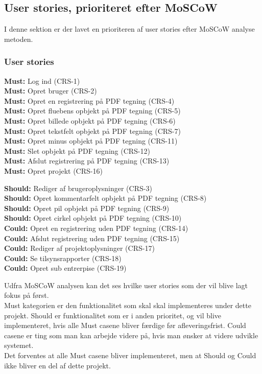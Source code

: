 \subsection{User stories, prioriteret efter MoSCoW} \label{sec:MoSCoW}
I denne sektion er der lavet en prioriteren af user stories efter MoSCoW analyse metoden.

\subsubsection{User stories}
\textbf{Must:} Log ind (CRS-1) \\
\textbf{Must:} Opret bruger (CRS-2) \\
\textbf{Must:} Opret en registrering på PDF tegning (CRS-4) \\
\textbf{Must:} Opret fluebens opbjekt på PDF tegning (CRS-5) \\
\textbf{Must:} Opret billede opbjekt på PDF tegning (CRS-6) \\
\textbf{Must:} Opret tekstfelt opbjekt på PDF tegning (CRS-7) \\
\textbf{Must:} Opret minus opbjekt på PDF tegning (CRS-11) \\
\textbf{Must:} Slet opbjekt på PDF tegning (CRS-12) \\
\textbf{Must:} Afslut registrering på PDF tegning (CRS-13) \\
\textbf{Must:} Opret projekt (CRS-16) \\

\clearpage

\textbf{Should:} Rediger af brugeroplysninger (CRS-3) \\
\textbf{Should:} Opret kommentarfelt opbjekt på PDF tegning (CRS-8) \\
\textbf{Should:} Opret pil opbjekt på PDF tegning (CRS-9) \\
\textbf{Should:} Opret cirkel opbjekt på PDF tegning (CRS-10) \\

\textbf{Could:} Opret en registrering uden PDF tegning (CRS-14) \\
\textbf{Could:} Afslut registrering uden PDF tegning (CRS-15) \\
\textbf{Could:} Rediger af projektoplysninger (CRS-17) \\
\textbf{Could:} Se tilsynsrapporter (CRS-18) \\
\textbf{Could:} Opret sub entrerpise (CRS-19)

Udfra MoSCoW analysen kan det ses hvilke user stories som der vil blive lagt fokus på først. \\
Must kategorien er den funktionalitet som skal skal implementeres under dette projekt. Should er funktionalitet som er i anden prioritet, og vil blive implementeret, hvis alle Must casene bliver færdige før afleveringsfrist. Could casene er ting som man kan arbejde videre på, hvis man ønsker at videre udvikle systemet. \\
Det forventes at alle Must casene bliver implementeret, men at Should og Could ikke bliver en del af dette projekt.
	